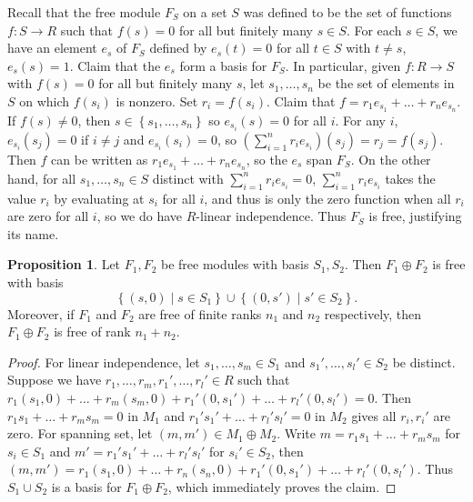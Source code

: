 \documentclass{article}
\newcommand{\rb}[1]{\left( #1 \right)}
\newcommand{\cb}[1]{\left\{ #1 \right\}}
\theoremstyle{definition}\newtheorem{definition}{Definition}[subsection]
\theoremstyle{definition}\newtheorem{remark}[definition]{Remark}
\theoremstyle{definition}\newtheorem*{example}{Example}
\theoremstyle{definition}\newtheorem*{note}{Note}
\newtheorem{proposition}[definition]{Proposition}
\begin{document}
Recall that the free module $ F_S $ on a set $ S $ was defined to be the set of functions $ f : S \to R $ such that $ f\rb{s} = 0 $ for all but finitely many $ s \in S $. For each $ s \in S $, we have an element $ e_s $ of $ F_S $ defined by $ e_s\rb{t} = 0 $ for all $ t \in S $ with $ t \ne s $, $ e_s\rb{s} = 1 $. Claim that the $ e_s $ form a basis for $ F_S $. In particular, given $ f : R \to S $ with $ f\rb{s} = 0 $ for all but finitely many $ s $, let $ s_1, \dots, s_n $ be the set of elements in $ S $ on which $ f\rb{s_i} $ is nonzero. Set $ r_i = f\rb{s_i} $. Claim that $ f = r_1e_{s_1} + \dots + r_ne_{s_n} $. If $ f\rb{s} \ne 0 $, then $ s \in \cb{s_1, \dots, s_n} $ so $ e_{s_i}\rb{s} = 0 $ for all $ i $. For any $ i $, $ e_{s_i}\rb{s_j} = 0 $ if $ i \ne j $ and $ e_{s_i}\rb{s_i} = 0 $, so $ \rb{\sum_{i = 1}^n r_ie_{s_i}}\rb{s_j} = r_j = f\rb{s_j} $. Then $ f $ can be written as $ r_1e_{s_1} + \dots + r_ne_{s_n} $, so the $ e_s $ span $ F_S $. On the other hand, for all $ s_1, \dots, s_n \in S $ distinct with $ \sum_{i = 1}^n r_ie_{s_i} = 0 $, $ \sum_{i = 1}^n r_ie_{s_i} $ takes the value $ r_i $ by evaluating at $ s_i $ for all $ i $, and thus is only the zero function when all $ r_i $ are zero for all $ i $, so we do have $ R $-linear independence. Thus $ F_S $ is free, justifying its name.

\begin{proposition}
Let $ F_1, F_2 $ be free modules with basis $ S_1, S_2 $. Then $ F_1 \oplus F_2 $ is free with basis
$$ \cb{\rb{s, 0} \mid s \in S_1} \cup \cb{\rb{0, s'} \mid s' \in S_2}. $$ Moreover, if $ F_1 $ and $ F_2 $ are free of finite ranks $ n_1 $ and $ n_2 $ respectively, then $ F_1 \oplus F_2 $ is free of rank $ n_1 + n_2 $.
\end{proposition}

\begin{proof}
For linear independence, let $ s_1, \dots, s_m \in S_1 $ and $ s_1', \dots, s_l' \in S_2 $ be distinct. Suppose we have $ r_1, \dots, r_m, r_1', \dots, r_l' \in R $ such that $ r_1\rb{s_1, 0} + \dots + r_m\rb{s_m, 0} + r_1'\rb{0, s_1'} + \dots + r_l'\rb{0, s_l'} = 0 $. Then $ r_1s_1 + \dots + r_ms_m = 0 $ in $ M_1 $ and $ r_1's_1' + \dots + r_l's_l' = 0 $ in $ M_2 $ gives all $ r_i, r_i' $ are zero. For spanning set, let $ \rb{m, m'} \in M_1 \oplus M_2 $. Write $ m = r_1s_1 + \dots + r_ms_m $ for $ s_i \in S_1 $ and $ m' = r_1's_1' + \dots + r_l's_l' $ for $ s_i' \in S_2 $, then $ \rb{m, m'} = r_1\rb{s_1, 0} + \dots + r_n\rb{s_n, 0} + r_1'\rb{0, s_1'} + \dots + r_l'\rb{0, s_l'} $. Thus $ S_1 \cup S_2 $ is a basis for $ F_1 \oplus F_2 $, which immediately proves the claim.
\end{proof}
\end{document}
